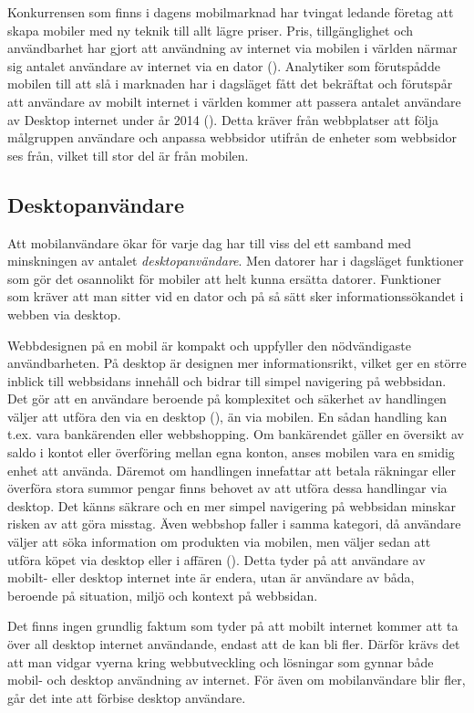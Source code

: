 \documentclass[11pt]{article}
\begin{document}
Konkurrensen som finns i dagens mobilmarknad har tvingat ledande företag att skapa mobiler med ny teknik till allt lägre priser. Pris, tillgänglighet och användbarhet har gjort att användning av internet via mobilen i världen närmar sig antalet användare av internet via en dator (\cite{morganstanley}). Analytiker som förutspådde mobilen till att slå i marknaden har i dagsläget fått det bekräftat och förutspår att användare av mobilt internet i världen kommer att passera antalet användare av Desktop internet  under år 2014 (\cite{morganstanley}). Detta kräver från webbplatser att följa målgruppen användare och anpassa webbsidor utifrån de enheter som webbsidor ses från, vilket till stor del är från mobilen.

\subsection{Desktopanvändare}
Att mobilanvändare ökar för varje dag har till viss del ett samband med minskningen av antalet \textit{desktopanvändare}. Men datorer har i dagsläget funktioner som gör det osannolikt för mobiler att helt kunna ersätta datorer. Funktioner som kräver att man sitter vid en dator och på så sätt sker informationssökandet i webben via desktop. 

Webbdesignen på en mobil är kompakt och uppfyller den nödvändigaste användbarheten.
På desktop är designen mer informationsrikt, vilket ger en större inblick till webbsidans innehåll och bidrar till simpel navigering på webbsidan. Det gör att en användare beroende på komplexitet och säkerhet av handlingen väljer att utföra den via en desktop (\cite{userbeh}), än via mobilen. En sådan handling kan t.ex. vara bankärenden eller webbshopping. Om bankärendet gäller en översikt av saldo i kontot eller överföring mellan egna konton, anses mobilen vara en smidig enhet att använda. Däremot om handlingen innefattar att betala räkningar eller överföra stora summor pengar finns behovet av att utföra dessa handlingar via desktop. Det känns säkrare och en mer simpel navigering på webbsidan minskar risken av att göra misstag. Även webbshop faller i samma kategori, då användare väljer att söka information om produkten via mobilen, men väljer sedan att utföra köpet via desktop eller i affären (\cite{userbeh}). Detta tyder på att användare av mobilt- eller desktop internet inte är endera, utan är användare av båda, beroende på situation, miljö och kontext på webbsidan.

Det finns ingen grundlig faktum som tyder på att mobilt internet kommer att ta över all desktop internet användande, endast att de kan bli fler. Därför krävs det att man vidgar vyerna kring webbutveckling och lösningar som gynnar både mobil- och desktop användning av internet. För även om mobilanvändare blir fler, går det inte att förbise desktop användare.
\newpage
\end{document}
